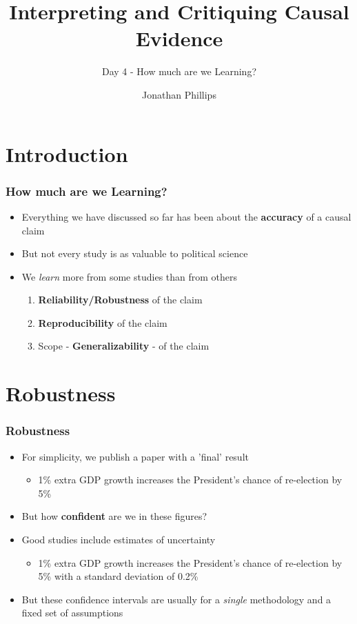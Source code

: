 \documentclass[xcolor=x11names,compress]{beamer}\usepackage[]{graphicx}\usepackage[]{xcolor}
\title{Interpreting and Critiquing Causal Evidence}
\subtitle{Day 4 - How much are we Learning?}
\author{Jonathan Phillips}
\renewcommand{\(}{\begin{columns}}
\renewcommand{\)}{\end{columns}}
\newcommand{\<}[1]{\begin{column}{#1}}
\renewcommand{\>}{\end{column}}
\begin{document}
\frame{\titlepage}

\section{Introduction}

\begin{frame}
\frametitle{How much are we Learning?}
\begin{itemize}
\item Everything we have discussed so far has been about the \textbf{accuracy} of a causal claim
\pause
\item But not every study is as valuable to political science
\pause
\item We \textit{learn} more from some studies than from others
\pause
\begin{enumerate}
\item \textbf{Reliability/Robustness} of the claim
\pause
\item \textbf{Reproducibility} of the claim
\pause
\item Scope - \textbf{Generalizability} - of the claim
\end{enumerate}
\end{itemize}
\end{frame}

\section{Robustness}

\begin{frame}
\frametitle{Robustness}
\begin{itemize}
\item For simplicity, we publish a paper with a 'final' result
\pause
\begin{itemize}
\item 1\% extra GDP growth increases the President's chance of re-election by 5\%
\pause
\end{itemize}
\item But how \textbf{confident} are we in these figures?
\pause
\item Good studies include estimates of uncertainty
\pause
\begin{itemize}
\item 1\% extra GDP growth increases the President's chance of re-election by 5\% with a standard deviation of 0.2\%
\pause
\end{itemize}
\item But these confidence intervals are usually for a \textit{single} methodology and a fixed set of assumptions
\end{itemize}
\end{frame}
\end{document}
